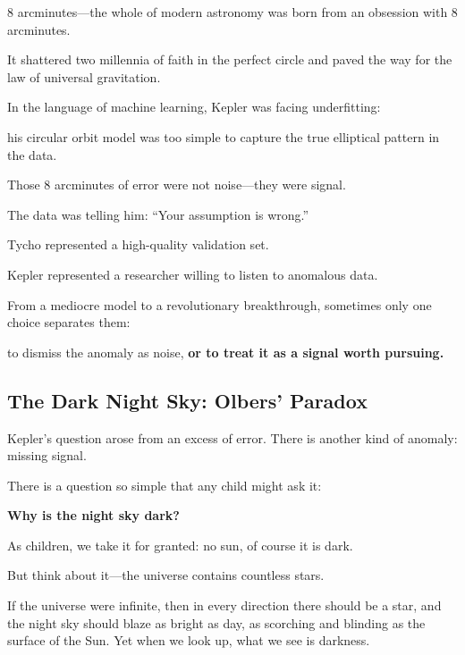 8 arcminutes---the whole of modern astronomy was born from an obsession with 8 arcminutes.

It shattered two millennia of faith in the perfect circle and paved the way for the law of universal gravitation.

\vspace{1em}

In the language of machine learning, Kepler was facing underfitting:

his circular orbit model was too simple to capture the true elliptical pattern in the data.

Those 8 arcminutes of error were not noise---they were signal.

The data was telling him: ``Your assumption is wrong.''

\vspace{1em}

Tycho represented a high-quality validation set.

Kepler represented a researcher willing to listen to anomalous data.

From a mediocre model to a revolutionary breakthrough, sometimes only one choice separates them:

to dismiss the anomaly as noise, \textbf{or to treat it as a signal worth pursuing.}

\subsection{The Dark Night Sky: Olbers' Paradox}

Kepler's question arose from an excess of error. There is another kind of anomaly: missing signal.

There is a question so simple that any child might ask it:

\textbf{Why is the night sky dark?}

\vspace{1em}

As children, we take it for granted: no sun, of course it is dark.

But think about it---the universe contains countless stars.

If the universe were infinite, then in every direction there should be a star, and the night sky should blaze as bright as day, as scorching and blinding as the surface of the Sun. Yet when we look up, what we see is darkness.

\vspace{1em}

